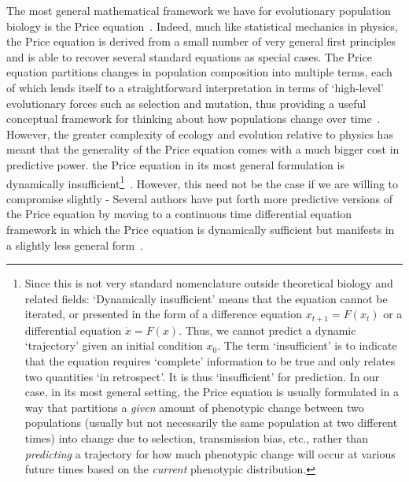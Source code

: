 The most general mathematical framework we have for evolutionary population biology is the Price equation~\citep{frank_natural_2012,frank_universal_2017,queller_fundamental_2017,luque_one_2017,lion_theoretical_2018,lehtonen_price_2018,lehtonen_price_2020,luque_mirror_2021}. Indeed, much like statistical mechanics in physics, the Price equation is derived from a small number of very general first principles and is able to recover several standard equations as special cases. The Price equation partitions changes in population composition into multiple terms, each of which lends itself to a straightforward interpretation in terms of `high-level' evolutionary forces such as selection and mutation, thus providing a useful conceptual framework for thinking about how populations change over time~\citep{frank_natural_2012}. However, the greater complexity of ecology and evolution relative to physics has meant that the generality of the Price equation comes with a much bigger cost in predictive power. the Price equation in its most general formulation is dynamically insufficient\footnote{Since this is not very standard nomenclature outside theoretical biology and related fields: `Dynamically insufficient' means that the equation cannot be iterated, or presented in the form of a difference equation $x_{t+1} = F(x_t)$ or a differential equation $\dot{x} = F(x)$. Thus, we cannot predict a dynamic `trajectory' given an initial condition $x_0$. The term `insufficient' is to indicate that the equation requires `complete' information to be true and only relates two quantities `in retrospect'. It is thus `insufficient' for prediction. In our case, in its most general setting, the Price equation is usually formulated in a way that partitions a \emph{given} amount of phenotypic change between two populations (usually but not necessarily the same population at two different times) into change due to selection, transmission bias, etc., rather than \emph{predicting} a trajectory for how much phenotypic change will occur at various future times based on the \emph{current} phenotypic distribution.}~\citep{van_veelen_use_2005,frank_natural_2012,simon_continuous-time_2014,queller_fundamental_2017}. However, this need not be the case if we are willing to compromise slightly - Several authors have put forth more predictive versions of the Price equation by moving to a continuous time differential equation framework in which the Price equation is dynamically sufficient but manifests in a slightly less general form~\citep{page_unifying_2002,lion_theoretical_2018,day_price_2020}.

